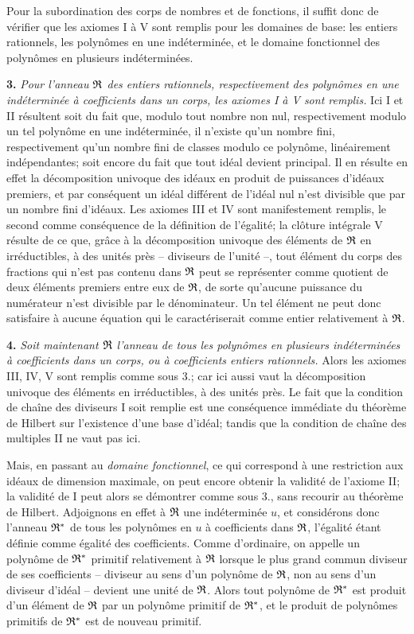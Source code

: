 Pour la subordination des corps de nombres et de fonctions, il suffit donc de vérifier que les axiomes I à V sont remplis pour les domaines de base: les entiers rationnels, les polynômes en une indéterminée, et le domaine fonctionnel des polynômes en plusieurs indéterminées.

\textbf{3.} \emph{Pour l'anneau $\mathfrak{R}$ des entiers rationnels, respectivement des polynômes en une indéterminée à coefficients dans un corps, les axiomes I à V sont remplis.} Ici I et II résultent soit du fait que, modulo tout nombre non nul, respectivement modulo un tel polynôme en une indéterminée, il n'existe qu'un nombre fini, respectivement qu'un nombre fini de classes modulo ce polynôme, linéairement indépendantes; soit encore du fait que tout idéal devient principal. Il en résulte en effet la décomposition univoque des idéaux en produit de puissances d'idéaux premiers, et par conséquent un idéal différent de l'idéal nul n'est divisible que par un nombre fini d'idéaux. Les axiomes III et IV sont manifestement remplis, le second comme conséquence de la définition de l'égalité; la clôture intégrale V résulte de ce que, grâce à la décomposition univoque des éléments de $\mathfrak{R}$ en irréductibles, à des unités près -- diviseurs de l'unité --, tout élément du corps des fractions qui n'est pas contenu dans $\mathfrak{R}$ peut se représenter comme quotient de deux éléments premiers entre eux de $\mathfrak{R}$, de sorte qu'aucune puissance du numérateur n'est divisible par le dénominateur. Un tel élément ne peut donc satisfaire à aucune équation qui le caractériserait comme entier relativement à $\mathfrak{R}$.

\textbf{4.} \emph{Soit maintenant $\mathfrak{R}$ l'anneau de tous les polynômes en plusieurs indéterminées à coefficients dans un corps, ou à coefficients entiers rationnels.} Alors les axiomes III, IV, V sont remplis comme sous 3.; car ici aussi vaut la décomposition univoque des éléments en irréductibles, à des unités près. Le fait que la condition de chaîne des diviseurs I soit remplie est une conséquence immédiate du théorème de Hilbert sur l'existence d'une base d'idéal; tandis que la condition de chaîne des multiples II ne vaut pas ici.

Mais, en passant au \emph{domaine fonctionnel}, ce qui correspond à une restriction aux idéaux de dimension maximale, on peut encore obtenir la validité de l'axiome II; la validité de I peut alors se démontrer comme sous 3., sans recourir au théorème de Hilbert. Adjoignons en effet à $\mathfrak{R}$ une indéterminée $u$, et considérons donc l'anneau $\mathfrak{R}^*$ de tous les polynômes en $u$ à coefficients dans $\mathfrak{R}$, l'égalité étant définie comme égalité des coefficients. Comme d'ordinaire, on appelle un polynôme de $\mathfrak{R}^*$ primitif relativement à $\mathfrak{R}$ lorsque le plus grand commun diviseur de ses coefficients -- diviseur au sens d'un polynôme de $\mathfrak{R}$, non au sens d'un diviseur d'idéal -- devient une unité de $\mathfrak{R}$. Alors tout polynôme de $\mathfrak{R}^*$ est produit d'un élément de $\mathfrak{R}$ par un polynôme primitif de $\mathfrak{R}^*$, et le produit de polynômes primitifs de $\mathfrak{R}^*$ est de nouveau primitif.

